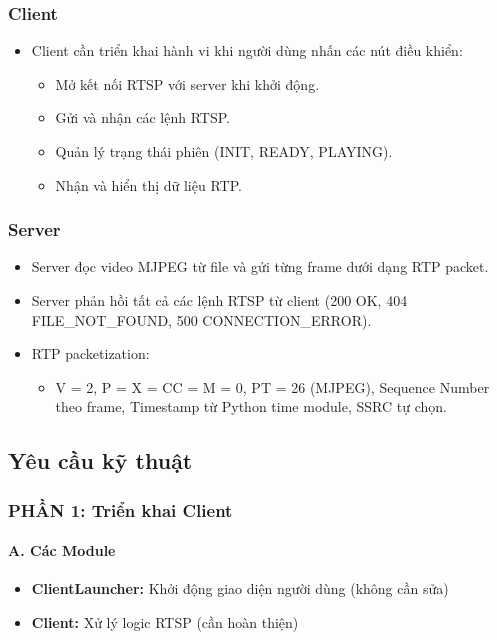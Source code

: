 \documentclass[a4paper,12pt]{article}
\begin{document}
\subsubsection{Client}
\begin{itemize}
    \item Client cần triển khai hành vi khi người dùng nhấn các nút điều khiển:
    \begin{itemize}
        \item Mở kết nối RTSP với server khi khởi động.
        \item Gửi và nhận các lệnh RTSP.
        \item Quản lý trạng thái phiên (INIT, READY, PLAYING).
        \item Nhận và hiển thị dữ liệu RTP.
    \end{itemize}
\end{itemize}

\subsubsection{Server}
\begin{itemize}
    \item Server đọc video MJPEG từ file và gửi từng frame dưới dạng RTP packet.
    \item Server phản hồi tất cả các lệnh RTSP từ client (200 OK, 404 FILE\_NOT\_FOUND, 500 CONNECTION\_ERROR).
    \item RTP packetization:
    \begin{itemize}
        \item V = 2, P = X = CC = M = 0, PT = 26 (MJPEG), Sequence Number theo frame, Timestamp từ Python time module, SSRC tự chọn.
    \end{itemize}
\end{itemize}

\subsection{Yêu cầu kỹ thuật}

\subsubsection{PHẦN 1: Triển khai Client}

\paragraph{A. Các Module}
\begin{itemize}
    \item \textbf{ClientLauncher:} Khởi động giao diện người dùng (không cần sửa)
    \item \textbf{Client:} Xử lý logic RTSP (cần hoàn thiện)
\end{itemize}
\end{document}
